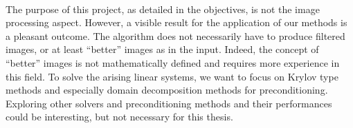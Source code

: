 \paragraph{}
The purpose of this project, as detailed in the objectives, is not the image processing aspect.
However, a visible result for the application of our methods is a pleasant outcome.
The algorithm does not necessarily have to produce filtered images, or at least ``better'' images as in the input.
Indeed, the concept of ``better'' images is not mathematically defined and requires more experience in this field.
To solve the arising linear systems, we want to focus on Krylov type methods and especially domain decomposition methods for preconditioning.
Exploring other solvers and preconditioning methods and their performances could be interesting, but not necessary for this thesis.
